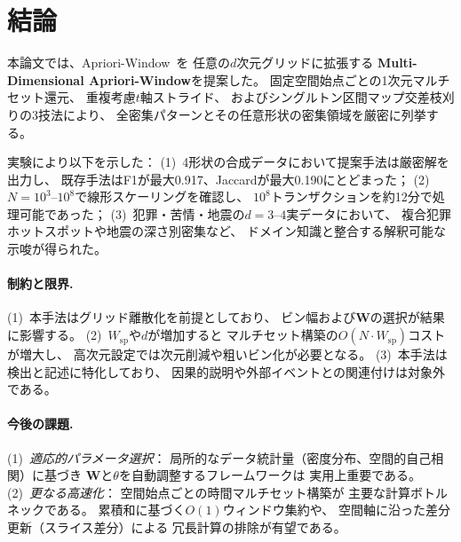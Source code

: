 \section{結論}\label{sec:conclusion}

本論文では、Apriori-Window~\cite{aprioriwindow}を
任意の$d$次元グリッドに拡張する
\textbf{Multi-Dimensional Apriori-Window}を提案した。
固定空間始点ごとの1次元マルチセット還元、
重複考慮$t$軸ストライド、
およびシングルトン区間マップ交差枝刈りの3技法により、
全密集パターンとその任意形状の密集領域を厳密に列挙する。

実験により以下を示した：
(1)~4形状の合成データにおいて提案手法は厳密解を出力し、
既存手法はF1が最大0.917、Jaccardが最大0.190にとどまった；
(2)~$N = 10^3$--$10^8$で線形スケーリングを確認し、
$10^8$トランザクションを約12分で処理可能であった；
(3)~犯罪・苦情・地震の$d{=}3$--$4$実データにおいて、
複合犯罪ホットスポットや地震の深さ別密集など、
ドメイン知識と整合する解釈可能な示唆が得られた。

\paragraph{制約と限界.}
(1)~本手法はグリッド離散化を前提としており、
ビン幅および$\bm{W}$の選択が結果に影響する。
(2)~$W_{\mathrm{sp}}$や$d$が増加すると
マルチセット構築の$O(N \cdot W_{\mathrm{sp}})$コストが増大し、
高次元設定では次元削減や粗いビン化が必要となる。
(3)~本手法は検出と記述に特化しており、
因果的説明や外部イベントとの関連付けは対象外である。

\paragraph{今後の課題.}
(1)~\emph{適応的パラメータ選択}：
局所的なデータ統計量（密度分布、空間的自己相関）に基づき
$\bm{W}$と$\theta$を自動調整するフレームワークは
実用上重要である。
(2)~\emph{更なる高速化}：
空間始点ごとの時間マルチセット構築が
主要な計算ボトルネックである。
累積和に基づく$O(1)$ウィンドウ集約や、
空間軸に沿った差分更新（スライス差分）による
冗長計算の排除が有望である。
